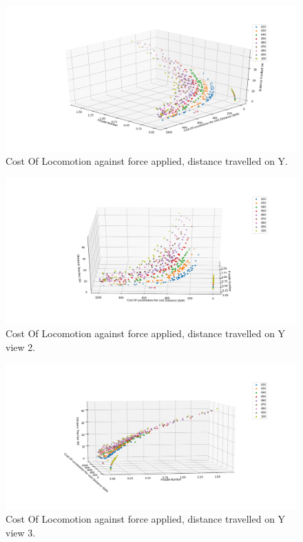 \begin{figure}[h!]
  \centering
  \includegraphics[width=1\textwidth]{figures/3dgraph.png} 
  \caption{Cost Of Locomotion against force applied, distance travelled on Y.}
  \label{3dgraph1}
\end{figure}

\begin{figure}[h!]
  \centering
  \includegraphics[width=1\textwidth]{figures/3dgraph2.png}
  \caption{Cost Of Locomotion against force applied, distance travelled on Y view 2.}
  \label{3dgraph2}
\end{figure}

\begin{figure}[h!]
  \centering
  \includegraphics[width=1\textwidth]{figures/3dgraph3.png}
  \caption{Cost Of Locomotion against force applied, distance travelled on Y view 3.}
  \label{3dgraph2}
\end{figure}
